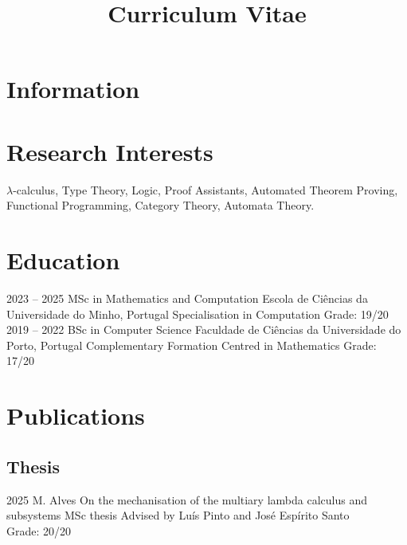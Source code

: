 \documentclass[11pt,a4paper]{moderncv}
\title{Curriculum Vitae}
\begin{document}
\makecvtitle 

\section{Information}



\section{Research Interests}
\cvitem
	{}
	{$\lambda$-calculus, Type Theory, Logic, Proof Assistants,
          Automated Theorem Proving, Functional Programming,
          Category Theory, Automata Theory.}



\section{Education}
\cventry
	{2023 -- 2025}
	{MSc in Mathematics and Computation}
	{Escola de Ciências da Universidade do Minho, Portugal}{}
	{Specialisation in Computation}
	{Grade: 19/20}
\cventry
	{2019 -- 2022}
	{BSc in Computer Science}
	{Faculdade de Ciências da Universidade do Porto, Portugal}{}
	{Complementary Formation Centred in Mathematics}
	{Grade: 17/20}



\section{Publications}



\subsection{Thesis}
\cventry
	{2025}
	{M. Alves}{}
	{On the mechanisation of the multiary lambda calculus and subsystems}
	{MSc thesis}
	{Advised by Luís Pinto and José Espírito Santo \\ Grade: 20/20}
\end{document}
